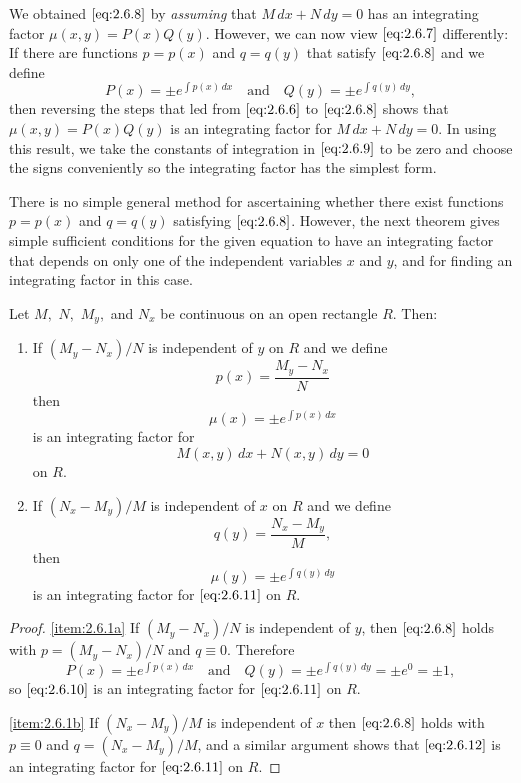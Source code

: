 \documentclass{ximera}
\begin{document}
We obtained $\eqref{eq:2.6.8}$ by \textit{assuming} that $M\,dx+N\,dy=0$ has
an integrating factor $\mu(x,y)=P(x)Q(y)$. However, we can
now view $\eqref{eq:2.6.7}$ differently: If there are functions $p=p(x)$
and $q=q(y)$  that satisfy $\eqref{eq:2.6.8}$ and we define
\begin{equation} \label{eq:2.6.9}
P(x)=\pm e^{\int p(x)\,dx}\quad\text{and}\quad
Q(y)=\pm e^{\int q(y)\,dy},
\end{equation}
then reversing the steps that led from $\eqref{eq:2.6.6}$ to
$\eqref{eq:2.6.8}$ shows that $\mu(x,y)=P(x)Q(y)$ is an integrating factor
for $M\,dx+N\,dy=0$. In using this result, we take the constants of
integration in $\eqref{eq:2.6.9}$ to be zero and choose the signs
conveniently so the integrating factor has the simplest form.

There is no simple general method for ascertaining
whether there exist functions $p=p(x)$ and $q=q(y)$ satisfying $\eqref{eq:2.6.8}$. However, the next theorem gives simple sufficient
conditions for the given equation to have an integrating factor that
depends on only one of the independent variables $x$ and $y$, and for finding an integrating factor in this case.

\begin{theorem}\label{thmtype:2.6.1}
Let $M,$ $N,$ $M_y,$ and $N_x$ be continuous on an open rectangle $R.$
Then:
\begin{enumerate}
\item \label{item:2.6.1a} %
 If $(M_y-N_x)/N$ is independent
of $y$ on $R$ and  we define
$$
p(x)=\frac{M_y-N_x}{N}
$$
 then
\begin{equation}\label{eq:2.6.10}
\mu(x)=\pm e^{\int p(x)\,dx}
\end{equation}
is an integrating factor for
\begin{equation}\label{eq:2.6.11}
M(x,y)\,dx+N(x,y)\,dy=0
\end{equation}
on $R.$
\item \label{item:2.6.1b} %
If $(N_x-M_y)/M$ is independent of $x$ on
$R$ and we define
$$
q(y)=\frac{N_x-M_y}{M},
$$
then
\begin{equation}\label{eq:2.6.12}
\mu(y)=\pm e^{\int q(y)\,dy}
\end{equation}
 is an integrating factor for $\eqref{eq:2.6.11}$ on $R.$
\end{enumerate}
\end{theorem}



\begin{proof} \ref{item:2.6.1a}
If $(M_y-N_x)/N$ is independent of $y$, then $\eqref{eq:2.6.8}$
 holds with $p=(M_y-N_x)/N$ and $q\equiv0$. Therefore
 $$
P(x)=\pm e^{\int p(x)\,dx}\quad\text{and}\quad Q(y)=\pm e^{\int
q(y)\,dy}=\pm e^0=\pm1,
 $$
so $\eqref{eq:2.6.10}$ is an integrating factor for $\eqref{eq:2.6.11}$ on $R$.

\ref{item:2.6.1b} If $(N_x-M_y)/M$ is independent of $x$ then $\eqref{eq:2.6.8}$ holds
with $p\equiv0$ and $q=(N_x-M_y)/M$, and a similar argument shows that
$\eqref{eq:2.6.12}$ is an integrating factor for $\eqref{eq:2.6.11}$ on $R$.
\end{proof}
\end{document}
